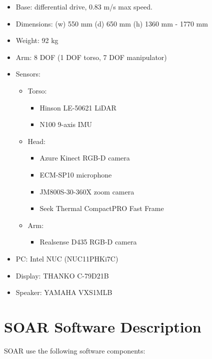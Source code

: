 \begin{itemize}
	\item Base: differential drive, 0.83 m/s max speed.
	\item Dimensions: (w) 550 mm (d) 650 mm (h) 1360 mm - 1770 mm
	\item Weight: 92 kg
	\item Arm: 8 DOF (1 DOF torso, 7 DOF manipulator)
	\item Sensors:
	      \begin{itemize}
		      \item Torso:
		            \begin{itemize}
			            \item Hinson LE-50621 LiDAR
			            \item N100 9-axis IMU
		            \end{itemize}
		      \item Head:
		            \begin{itemize}
			            \item Azure Kinect RGB-D camera
			            \item ECM-SP10 microphone
			            \item JM800S-30-360X zoom camera
			            \item Seek Thermal CompactPRO Fast Frame
		            \end{itemize}
		      \item Arm:
		            \begin{itemize}
			            \item Realsense D435 RGB-D camera
		            \end{itemize}
	      \end{itemize}
	\item PC: Intel NUC (NUC11PHKi7C)
	\item Display: THANKO C-79D21B
	\item Speaker: YAMAHA VXS1MLB
\end{itemize}

\section*{SOAR Software Description}

SOAR use the following software components:

